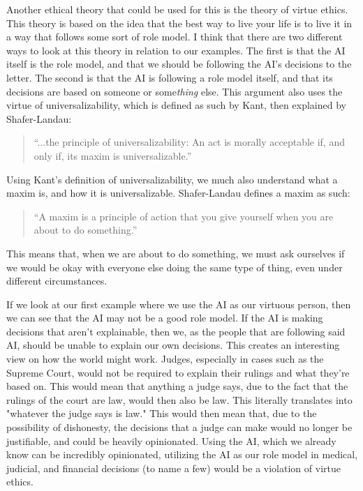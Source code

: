 \documentclass[12pt]{article}
\begin{document}
    Another ethical theory that could be used for this is the theory of virtue ethics. This theory is based on the idea
    that the best way to live your life is to live it in a way that follows some sort of role model. I think that there
    are two different ways to look at this theory in relation to our examples. The first is that the AI itself is the role
    model, and that we should be following the AI's decisions to the letter. The second is that the AI is following a role
    model itself, and that its decisions are based on someone or some\textit{thing} else. This argument also uses the virtue
    of universalizability, which is defined as such by Kant, then explained by Shafer-Landau:
    \begin{quote}
        ``...the principle of universalizability: An act is morally acceptable if, and only if, its maxim is universalizable.'' \autocite{ShaferLandau}
    \end{quote}
    Using Kant's definition of universalizability, we much also understand what a maxim is, and how it is universalizable.
    Shafer-Landau defines a maxim as such:
    \begin{quote}
        ``A maxim is a principle of action that you give yourself when you are about to do something.'' \autocite{ShaferLandau}
    \end{quote}
    This means that, when we are about to do something, we must ask ourselves if we would be okay with everyone else doing
    the same type of thing, even under different circumstances.

    If we look at our first example where we use the AI as our virtuous person, then we can see that the AI may not be a good role model.
    If the AI is making decisions that aren't explainable, then we, as the people that are following said AI, should be unable to
    explain our own decisions. This creates an interesting view on how the world might work. Judges, especially in cases such
    as the Supreme Court, would not be required to explain their rulings and what they're based on. This would mean that 
    anything a judge says, due to the fact that the rulings of the court are law, would then also be law. This literally
    translates into "whatever the judge says is law." This would then mean that, due to the possibility of dishonesty, the
    decisions that a judge can make would no longer be justifiable, and could be heavily opinionated. Using the AI, which we
    already know can be incredibly opinionated, utilizing the AI as our role model in medical, judicial, and financial decisions
    (to name a few) would be a violation of virtue ethics. 
\end{document}
